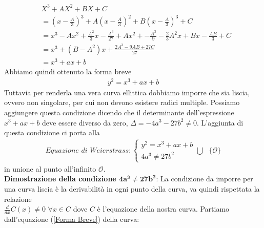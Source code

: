 \documentclass[a4paper,12pt]{tesiinfo}
\newcommand\ddfrac[2]{\frac{\displaystyle #1}{\displaystyle #2}}
\begin{document}
\begin{align*}
&X^3 + AX^2 + BX + C 
\\
&=\left(x- \ddfrac{A}{3} \right )^3 +A\left ( x - \ddfrac{A}{3} \right )^2 + B\left (x - \ddfrac{A}{3} \right )^3 +C
\\
&= x^3-Ax^2 + \ddfrac{A^2}{3}x - \ddfrac{A^3}{27} + Ax^2 + - \ddfrac{A^3}{9} -\ddfrac{2}{3}A^2x + Bx - \ddfrac{AB}{3} +C
\\
&= x^3 + (B-A^2)x + \ddfrac{2A^3-9AB+27C}{27}
\\
&= x^3 + ax+b
\end{align*}
Abbiamo quindi ottenuto la forma breve
\begin{gather}
y^2 = x^3 + ax+b
\label{Forma Breve}
\end{gather}
Tuttavia per renderla una vera curva ellittica dobbiamo imporre che sia liscia, ovvero non singolare, per cui non devono esistere radici multiple. Possiamo aggiungere questa condizione dicendo che il determinante dell'espressione $x^3 + ax+b$ deve essere diverso da zero, $\Delta = -4a^3 - 27b^2 \ne 0$. L'aggiunta di questa condizione ci porta alla
\begin{gather}
\textit{Equazione di Weierstrass}:
\begin{cases}
y^2 = x^3 + ax+b\\
4a^3 \ne 27b^2
\end{cases}
\bigcup \text{ } \{\mathcal{O}\}
\label{CE}
\end{gather}
in unione al punto all'infinito $\mathcal{O}$.
\\
\textbf{Dimostrazione della condizione $\mathbold{4a^3 \ne 27b^2}$}: La condizione da imporre per una curva liscia \`e la derivabilit\`a in ogni punto della curva, va quindi rispettata la relazione\\ $\ddfrac{d}{dx}C(x) \ne 0$ $ \forall x \in C$ dove $C$ \`e l'equazione della nostra curva. Partiamo dall'equazione (\ref{Forma Breve}) della curva: 
\end{document}

